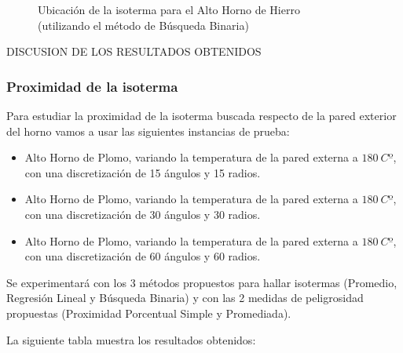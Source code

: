 \begin{figure}[H]
    \begin{center}
        \captionsetup{justification=centering}
        \caption{Ubicación de la isoterma para el Alto Horno de Hierro\\ (utilizando el método de Búsqueda Binaria)}
        \label{fig:isoterma_binaria_hierro_1}
    \end{center}
\end{figure}

DISCUSION DE LOS RESULTADOS OBTENIDOS

\subsubsection{Proximidad de la isoterma}


Para estudiar la proximidad de la isoterma buscada respecto de la pared exterior del horno vamos a usar las siguientes instancias de prueba:
\begin{itemize}
    \item Alto Horno de Plomo, variando la temperatura de la pared externa a $180\ Cº$, con una discretización de 15 ángulos y 15 radios.
    \item Alto Horno de Plomo, variando la temperatura de la pared externa a $180\ Cº$, con una discretización de 30 ángulos y 30 radios.
    \item Alto Horno de Plomo, variando la temperatura de la pared externa a $180\ Cº$, con una discretización de 60 ángulos y 60 radios.
\end{itemize}

Se experimentará con los 3 métodos propuestos para hallar isotermas (Promedio, Regresión Lineal y Búsqueda Binaria) y con las 2 medidas de peligrosidad propuestas (Proximidad Porcentual Simple y Promediada).

La siguiente tabla muestra los resultados obtenidos:

